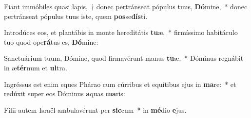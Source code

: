 \item Fiant immóbiles quasi lapis,~† donec pertránseat pópulus tuus, \textbf{Dó}mine,~* donec pertránseat pópulus tuus iste, quem \textbf{pos}se\textbf{dís}ti.
\item Introdúces eos, et plantábis in monte hereditátis \textbf{tu}æ,~* firmíssimo habitáculo tuo quod ope\textbf{rá}tus es, \textbf{Dó}mine:
\item Sanctuárium tuum, Dómine, quod firmavérunt manus \textbf{tu}æ.~* Dóminus regnábit in æ\textbf{tér}num et \textbf{ul}tra.
\item Ingréssus est enim eques Phárao cum cúrribus et equítibus ejus in \textbf{ma}re:~* et redúxit super eos Dóminus \textbf{a}quas \textbf{ma}ris:
\item Fílii autem Israël ambulavérunt per \textbf{sic}cum~* in \textbf{mé}dio \textbf{e}jus.
